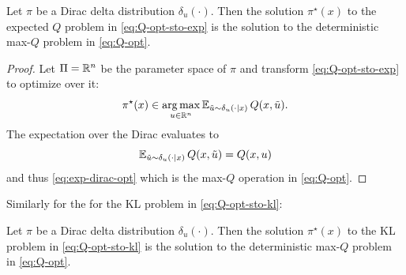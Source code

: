 \documentclass[twoside,11pt]{article}
\begin{document}
\begin{proposition}
  Let $\pi$ be a Dirac delta distribution $\delta_u(\cdot)$.
  Then the solution $\pi^\star(x)$ to the expected $Q$ problem in
  \cref{eq:Q-opt-sto-exp} is the solution to the deterministic
  max-$Q$ problem in \cref{eq:Q-opt}.
\end{proposition}

\begin{proof}
  Let $\Pi=\mathbb{R}^n$ be the parameter space of $\pi$ and transform
  \cref{eq:Q-opt-sto-exp} to optimize over it:
  \begin{equation}
  \pi^\star(x) \in \operatorname*{arg\,max}_{u\in\mathbb{R}^n} \operatorname{\mathbb{E}}_{\tilde u\sim\delta_u(\cdot\mid x)}{Q(x, \tilde u)}.
  \label{eq:exp-dirac-opt}
  \end{equation}
  The expectation over the Dirac evaluates to
  \begin{equation}
    \operatorname{\mathbb{E}}_{\tilde u\sim\delta_u(\cdot\mid x)}{Q(x, \tilde u)} = Q(x,u)
    \label{eq:exp-expansion}
  \end{equation}
  and thus \cref{eq:exp-dirac-opt}
  which is the max-$Q$ operation in \cref{eq:Q-opt}.
\end{proof}

\noindent Similarly for the for the KL problem in \cref{eq:Q-opt-sto-kl}:
\begin{proposition}
  Let $\pi$ be a Dirac delta distribution $\delta_u(\cdot)$.
  Then the solution $\pi^\star(x)$ to the KL problem in
  \cref{eq:Q-opt-sto-kl} is the solution to the deterministic
  max-$Q$ problem in \cref{eq:Q-opt}.
\end{proposition}
\end{document}
